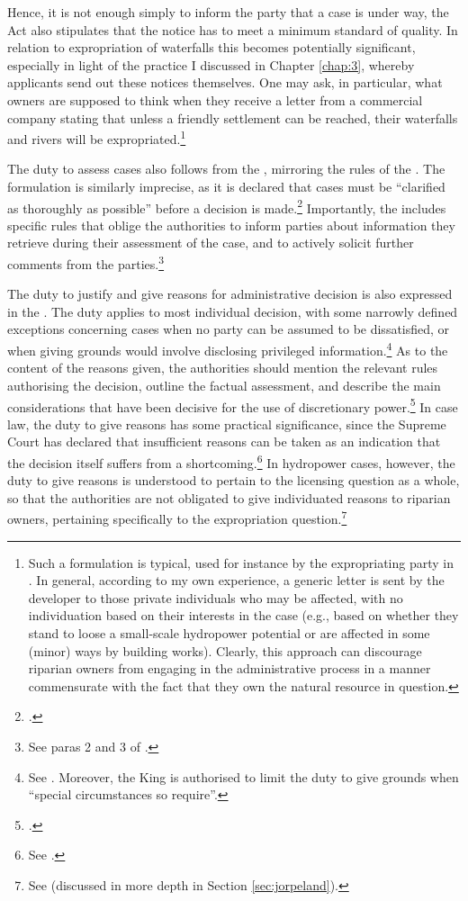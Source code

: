Hence, it is not enough simply to inform the party that a case is under way, the Act also stipulates that the notice has to meet a minimum standard of quality. In relation to expropriation of waterfalls this becomes potentially significant, especially in light of the practice I discussed in Chapter \ref{chap:3}, whereby applicants send out these notices themselves. One may ask, in particular, what owners are supposed to think when they receive a letter from a commercial company stating that unless a friendly settlement can be reached, their waterfalls and rivers will be expropriated.\footnote{Such a formulation is typical, used for instance by the expropriating party in \cite{sauda09}. In general, according to my own experience, a generic letter is sent by the developer to those private individuals who may be affected, with no individuation based on their interests in the case (e.g., based on whether they stand to loose a small-scale hydropower potential or  are affected in some (minor) ways by building works). Clearly, this approach can discourage riparian owners from engaging in the administrative process in a manner commensurate with the fact that they own the natural resource in question.}

The duty to assess cases also follows from the \cite{paa67}, mirroring the rules of the \cite{ea59}. The formulation is similarly imprecise, as it is declared that cases must be ``clarified as thoroughly as possible'' before a decision is made.\footcite[17]{paa67} Importantly, the \cite{paa67} includes specific rules that oblige the authorities to inform parties about information they retrieve during their assessment of the case, and to actively solicit further comments from the parties.\footnote{See paras 2 and 3 of \cite[17]{paa67}.}

The duty to justify and give reasons for administrative decision is also expressed in the \cite{paa67}. The duty applies to most individual decision, with some narrowly defined exceptions concerning cases when no party can be assumed to be dissatisfied, or when giving grounds would involve disclosing privileged information.\footnote{See \cite[24]{paa67}. Moreover, the King is authorised to limit the duty to give grounds when ``special circumstances so require''.} As to the content of the reasons given, the authorities should mention the relevant rules authorising the decision, outline the factual assessment, and describe the main considerations that have been decisive for the use of discretionary power.\footcite[25]{paa67} In case law, the duty to give reasons has some practical significance, since the Supreme Court has declared that insufficient reasons can be taken as an indication that the decision itself suffers from a shortcoming.\footnote{See \cite{isene81,hauge00}.} In hydropower cases, however, the duty to give reasons is understood to pertain to the licensing question as a whole, so that the authorities are not obligated to give individuated reasons to riparian owners, pertaining specifically to the expropriation question.\footnote{See \cite{sauda09,jorpeland11} (discussed in more depth in Section \ref{sec:jorpeland}).}

